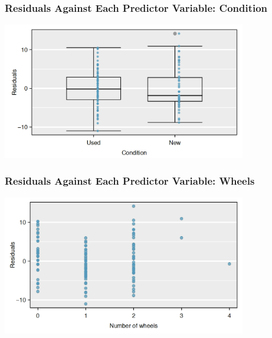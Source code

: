 \documentclass[handout]{beamer}
\begin{document}
\begin{frame}[fragile]
\frametitle{Residuals Against Each Predictor Variable: Condition}

\begin{center}
\includegraphics[width=0.8\textwidth]{figure/pred1.png}
\end{center}

\end{frame}


\begin{frame}[fragile]
\frametitle{Residuals Against Each Predictor Variable: Wheels}

\begin{center}
\includegraphics[width=0.8\textwidth]{figure/pred2.png}
\end{center}

\end{frame}
\end{document}
